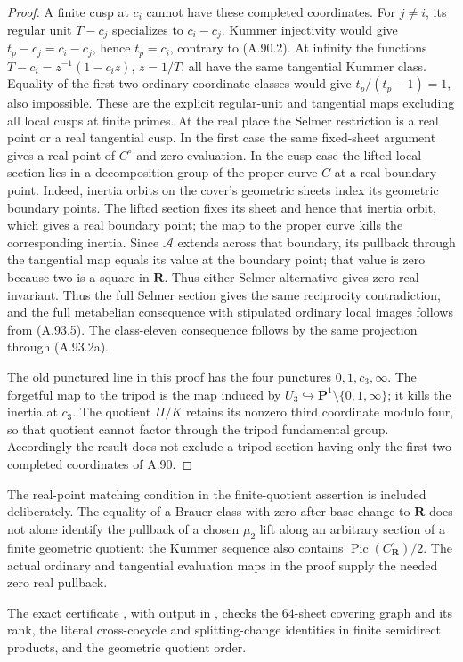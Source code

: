 \begin{proof}
A finite cusp at $c_i$ cannot have these
completed coordinates.
For $j\ne i$, its regular unit
$T-c_j$ specializes to $c_i-c_j$.
Kummer injectivity would give
$t_p-c_j=c_i-c_j$, hence $t_p=c_i$,
contrary to (A.90.2).
At infinity the functions
$T-c_i=z^{-1}(1-c_i z)$, $z=1/T$,
all have the same tangential Kummer
class.  Equality of the first two
ordinary coordinate classes would
give $t_p/(t_p-1)=1$, also impossible.
These are the explicit regular-unit
and tangential maps excluding all
local cusps at finite primes.
At the real place the Selmer restriction
is a real point or a real tangential
cusp.  In the first case the same
fixed-sheet argument gives a real point
of $C^\circ$ and zero evaluation.
In the cusp case the lifted local
section lies in a decomposition group
of the proper curve $C$ at a real
boundary point.
Indeed, inertia orbits on the cover's
geometric sheets index its geometric
boundary points.  The lifted section
fixes its sheet and hence that inertia
orbit, which gives a real boundary
point; the map to the proper curve
kills the corresponding inertia.
Since $\mathcal A$ extends across that
boundary, its pullback through the
tangential map equals its value at the
boundary point; that value is zero
because two is a square in $\mathbf R$.
Thus either Selmer alternative gives
zero real invariant.
Thus the full Selmer section gives
the same reciprocity contradiction,
and the full metabelian consequence
with stipulated ordinary local images
follows from (A.93.5).
The class-eleven consequence follows by
the same projection through (A.93.2a).

The old punctured line in this proof
has the four punctures
$0,1,c_3,\infty$.
The forgetful map to the tripod is
the map induced by
$U_3\hookrightarrow\mathbf P^1
\setminus\{0,1,\infty\}$; it kills
the inertia at $c_3$.
The quotient $\Pi/K$ retains its
nonzero third coordinate modulo four,
so that quotient cannot factor
through the tripod fundamental group.
Accordingly the result does not
exclude a tripod section having
only the first two completed
coordinates of A.90.
\end{proof}

The real-point matching condition in the finite-quotient
assertion is included deliberately.
The equality of a Brauer class with zero after base
change to $\mathbf R$ does not alone identify the
pullback of a chosen $\mu_2$ lift along an arbitrary
section of a finite geometric quotient: the Kummer
sequence also contains
$\operatorname{Pic}(C^\circ_\mathbf R)/2$.
The actual ordinary and tangential evaluation maps
in the proof supply the needed zero real pullback.

The exact certificate
,
with output in
,
checks the $64$-sheet covering graph and its rank,
the literal cross-cocycle and splitting-change
identities in finite semidirect products, and
the geometric quotient order.
